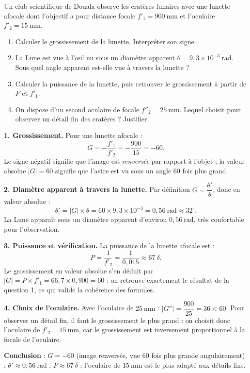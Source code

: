 \documentclass[11pt]{article}
\begin{document}
\begin{exoresolu}
Un club scientifique de Douala observe les cratères lunaires avec une lunette afocale dont l'objectif a pour distance focale $f'_1 = 900\ \text{mm}$ et l'oculaire $f'_2 = 15\ \text{mm}$.
\begin{enumerate}
\item Calculer le grossissement de la lunette. Interpréter son signe.
\item La Lune est vue à l'œil nu sous un diamètre apparent $\theta = 9,3\times 10^{-3}\ \text{rad}$. Sous quel angle apparent est-elle vue à travers la lunette ?
\item Calculer la puissance de la lunette, puis retrouver le grossissement à partir de $P$ et $f'_1$.
\item On dispose d'un second oculaire de focale $f''_2 = 25\ \text{mm}$. Lequel choisir pour observer un détail fin des cratères ? Justifier.
\end{enumerate}
\tcblower
\textbf{1. Grossissement.} Pour une lunette afocale :
\[ G = -\dfrac{f'_1}{f'_2} = -\dfrac{900}{15} = -60. \]
Le signe négatif signifie que l'image est \emph{renversée} par rapport à l'objet ; la valeur absolue $|G| = 60$ signifie que l'astre est vu sous un angle $60$ fois plus grand.

\textbf{2. Diamètre apparent à travers la lunette.} Par définition $G = \dfrac{\theta'}{\theta}$, donc en valeur absolue :
\[ \theta' = |G| \times \theta = 60 \times 9,3\times 10^{-3} = 0,56\ \text{rad} \approx 32^{\circ}. \]
La Lune apparaît sous un diamètre apparent d'environ $0,56\ \text{rad}$, très confortable pour l'observation.

\textbf{3. Puissance et vérification.} La puissance de la lunette afocale est :
\[ P = \dfrac{1}{f'_2} = \dfrac{1}{0,015} \approx 67\ \delta. \]
Le grossissement en valeur absolue s'en déduit par $|G| = P \times f'_1 = 66,7 \times 0,900 = 60$ : on retrouve exactement le résultat de la question 1, ce qui valide la cohérence des formules.

\textbf{4. Choix de l'oculaire.} Avec l'oculaire de $25\ \text{mm}$ : $|G''| = \dfrac{900}{25} = 36 < 60$. Pour observer un détail fin, il faut le grossissement le plus grand : on choisit donc l'oculaire de $f'_2 = 15\ \text{mm}$, car le grossissement est inversement proportionnel à la focale de l'oculaire.

\textbf{Conclusion} : $G = -60$ (image renversée, vue $60$ fois plus grande angulairement) ; $\theta' \approx 0,56\ \text{rad}$ ; $P \approx 67\ \delta$ ; l'oculaire de $15\ \text{mm}$ est le plus adapté aux détails fins.
\end{exoresolu}
\end{document}
